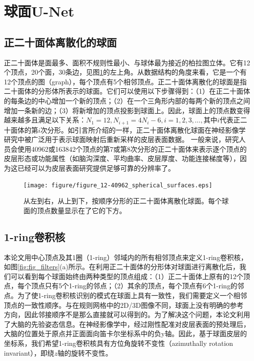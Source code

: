 \section{球面U-Net}\label{sec:球面U-Net}
\subsection{正二十面体离散化的球面}\label{sec:正二十面体离散化的球面}
正二十面体是面最多、面积不规则性最小、与球体最为接近的柏拉图立体\cite{PlatonicSolid}。它有12个顶点，20个面，30条边，见图\ref{fig:figure_12-40962_spherical_surfaces}的左上角。从数据结构的角度来看，它是一个有12个顶点的图（graph），每个顶点有5个相邻顶点。正二十面体离散化的球面是指二十面体的分形体所表示的球面。它们可以使用以下步骤得到：（1）在正二十面体的每条边的中心增加一个新的顶点；（2）在一个三角形内部的每两个新的顶点之间增加一条新的边；（3）将新增加的顶点投影到球面上。因此，球面上的顶点数变得越来越多且满足以下关系：$N_1=12,N_{i+1}=4N_i-6,i=1,2,3,\dots,$其中$i$代表正二十面体的第$i$次分形。如引言所介绍的一样，正二十面体离散化球面在神经影像学研究中被广泛用于表示球面映射后重新采样的皮层表面数据\cite{fischl2012freesurfer}。
一般来说，研究人员会使用40962或163842个顶点的第7或第8次分形的正二十面体来表示逐个顶点的皮层形态或功能属性（如脑沟深度、平均曲率、皮层厚度、功能连接梯度等），因为这已经可以为皮层表面研究提供足够可靠的分辨率了。

\begin{figure}[t]
    \centering
    \texttt{[image: figure/figure\_12-40962\_spherical\_surfaces.eps]}
    \caption{\label{fig:figure_12-40962_spherical_surfaces}从左到右，从上到下，按顺序分形的正二十面体离散化球面。每个球面的顶点数量显示在了它的下方。}
\end{figure}


\subsection{1-ring卷积核}\label{sec:1-ring卷积核}
本论文用中心顶点及其1圈（1-ring）邻域内的所有相邻顶点来定义1-ring卷积核，如图\ref{fig:fig_filters}(a)所示。在利用正二十面体的分形体对球面进行离散化后，我们可以看到每个球面始终由两种类型的顶点组成：（1）正二十面体上原有的12个顶点，每个顶点只有5个1-ring的邻点；（2）其余的顶点，每个顶点有6个1-ring的邻点。为了使1-ring卷积核识别的模式在球面上具有一致性，我们需要定义一个相邻顶点的一致性顺序。与在规则网格中的2D/3D图像不同，球面上没有明确的参考方向，因此邻接顺序不是那么直接就可以得到的。为了解决这个问题，本论文利用了大脑的先验姿态信息。在神经影像学中，经过刚性配准\cite{greve2009accurate}对皮层表面的预处理后，大脑的位置处于原点并正面面向笛卡尔坐标系中的负y轴。因此，基于球面皮层的坐标系，我们希望1-ring卷积核具有方位角旋转不变性（azimuthally rotation invariant），即绕$z$轴的旋转不变性。

